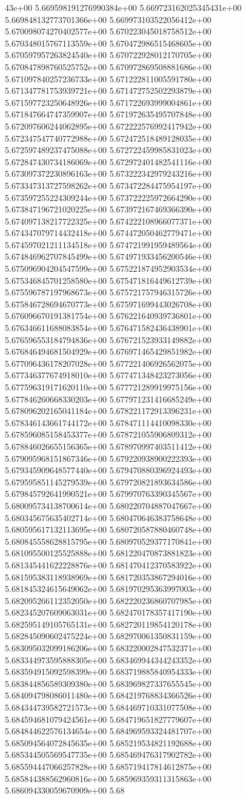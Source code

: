 43e+00	5.669598191276990384e+00	5.669723162025345431e+00	5.669848132773701366e+00	5.669973103522056412e+00	5.670098074270402577e+00	5.670223045018758512e+00	5.670348015767113559e+00	5.670472986515468605e+00	5.670597957263824540e+00	5.670722928012170705e+00	5.670847898760525752e+00	5.670972869508881686e+00	5.671097840257236733e+00	5.671222811005591780e+00	5.671347781753939721e+00	5.671472752502293879e+00	5.671597723250648926e+00	5.671722693999004861e+00	5.671847664747359907e+00	5.671972635495707848e+00	5.672097606244062895e+00	5.672222576992417942e+00	5.672347547740772988e+00	5.672472518489128035e+00	5.672597489237475088e+00	5.672722459985831023e+00	5.672847430734186069e+00	5.672972401482541116e+00	5.673097372230896163e+00	5.673222342979243216e+00	5.673347313727598262e+00	5.673472284475954197e+00	5.673597255224309244e+00	5.673722225972664290e+00	5.673847196721020225e+00	5.673972167469366390e+00	5.674097138217722325e+00	5.674222108966077371e+00	5.674347079714432418e+00	5.674472050462779471e+00	5.674597021211134518e+00	5.674721991959489564e+00	5.674846962707845499e+00	5.674971933456200546e+00	5.675096904204547599e+00	5.675221874952903534e+00	5.675346845701258580e+00	5.675471816449612739e+00	5.675596787197968673e+00	5.675721757946315726e+00	5.675846728694670773e+00	5.675971699443026708e+00	5.676096670191381754e+00	5.676221640939736801e+00	5.676346611688083854e+00	5.676471582436438901e+00	5.676596553184794836e+00	5.676721523933149882e+00	5.676846494681504929e+00	5.676971465429851982e+00	5.677096436178207028e+00	5.677221406926562075e+00	5.677346377674918010e+00	5.677471348423273056e+00	5.677596319171620110e+00	5.677721289919975156e+00	5.677846260668330203e+00	5.677971231416685249e+00	5.678096202165041184e+00	5.678221172913396231e+00	5.678346143661744172e+00	5.678471114410098330e+00	5.678596085158453377e+00	5.678721055906809312e+00	5.678846026655156365e+00	5.678970997403511412e+00	5.679095968151867346e+00	5.679220938900222393e+00	5.679345909648577440e+00	5.679470880396924493e+00	5.679595851145279539e+00	5.679720821893634586e+00	5.679845792641990521e+00	5.679970763390345567e+00	5.680095734138700614e+00	5.680220704887047667e+00	5.680345675635402714e+00	5.680470646383758648e+00	5.680595617132113695e+00	5.680720587880460748e+00	5.680845558628815795e+00	5.680970529377170841e+00	5.681095500125525888e+00	5.681220470873881823e+00	5.681345441622228876e+00	5.681470412370583922e+00	5.681595383118938969e+00	5.681720353867294016e+00	5.681845324615649062e+00	5.681970295363997003e+00	5.682095266112352050e+00	5.682220236860707985e+00	5.682345207609063031e+00	5.682470178357417190e+00	5.682595149105765131e+00	5.682720119854120178e+00	5.682845090602475224e+00	5.682970061350831159e+00	5.683095032099186206e+00	5.683220002847532371e+00	5.683344973595888305e+00	5.683469944344243352e+00	5.683594915092598399e+00	5.683719885840954333e+00	5.683844856589309380e+00	5.683969827337655545e+00	5.684094798086011480e+00	5.684219768834366526e+00	5.684344739582721573e+00	5.684469710331077508e+00	5.684594681079424561e+00	5.684719651827779607e+00	5.684844622576134654e+00	5.684969593324481707e+00	5.685094564072845635e+00	5.685219534821192688e+00	5.685344505569547735e+00	5.685469476317902782e+00	5.685594447066257828e+00	5.685719417814612875e+00	5.685844388562960816e+00	5.685969359311315863e+00	5.686094330059670909e+00	5.68